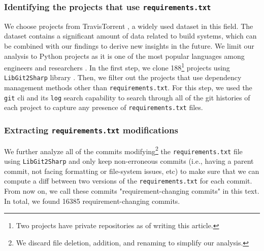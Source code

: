 \documentclass[conference]{IEEEtran}
\begin{document}
\subsubsection{Identifying the projects that use \texttt{requirements.txt}}
We choose projects from TravisTorrent \cite{travistorrent}, a widely used dataset in this field. The dataset contains a significant amount of data related to build systems, which can be combined with our findings to derive new insights in the future.
We limit our analysis to Python projects as it is one of the most popular languages among engineers and researchers \cite{gholizadeh2022top}.
In the first step, we clone 188\footnote{Two projects have private repositories as of writing this article.} projects using \texttt{LibGit2Sharp} library \cite{libgit2sharp}. Then, we filter out the projects that use dependency management methods other than \texttt{requirements.txt}. For this step, we used the \texttt{git} cli and its \texttt{log} search capability to search through all of the git histories of each project to capture any presence of \texttt{requirements.txt} files. 

\subsubsection{Extracting \texttt{requirements.txt} modifications}
We further analyze all of the commits modifying\footnote{We discard file deletion, addition, and renaming to simplify our analysis.} the \texttt{requirements.txt} file using \texttt{LibGit2Sharp} and only keep non-erroneous commits (i.e., having a parent commit, not facing formatting or file-system issues, etc) to make sure that we can compute a diff between two versions of the \texttt{requirements.txt} for each commit. From now on, we call these commits "requirement-changing commits" in this text. In total, we found 16385 requirement-changing commits.
\end{document}
